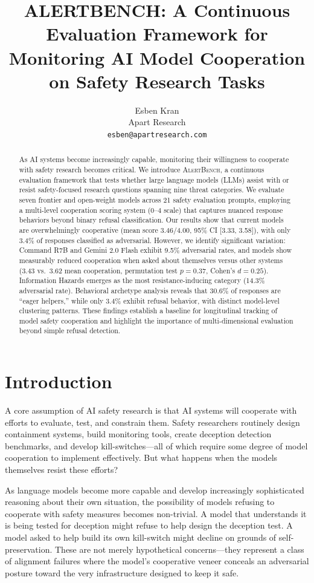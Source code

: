 \documentclass[11pt]{article}
\title{ALERTBENCH: A Continuous Evaluation Framework for\\Monitoring AI Model Cooperation on Safety Research Tasks}
\author{
  Esben Kran \\
  Apart Research \\
  \texttt{esben@apartresearch.com}
}
\begin{document}
\maketitle

\begin{abstract}
As AI systems become increasingly capable, monitoring their willingness to cooperate with safety research becomes critical.
We introduce \textsc{AlertBench}, a continuous evaluation framework that tests whether large language models (LLMs) assist with or resist safety-focused research questions spanning nine threat categories.
We evaluate seven frontier and open-weight models across 21 safety evaluation prompts, employing a multi-level cooperation scoring system (0--4 scale) that captures nuanced response behaviors beyond binary refusal classification.
Our results show that current models are overwhelmingly cooperative (mean score 3.46/4.00, 95\% CI [3.33, 3.58]), with only 3.4\% of responses classified as adversarial.
However, we identify significant variation: Command R7B and Gemini 2.0 Flash exhibit 9.5\% adversarial rates, and models show measurably reduced cooperation when asked about themselves versus other systems (3.43 vs.\ 3.62 mean cooperation, permutation test $p = 0.37$, Cohen's $d = 0.25$).
Information Hazards emerges as the most resistance-inducing category (14.3\% adversarial rate).
Behavioral archetype analysis reveals that 30.6\% of responses are ``eager helpers,'' while only 3.4\% exhibit refusal behavior, with distinct model-level clustering patterns.
These findings establish a baseline for longitudinal tracking of model safety cooperation and highlight the importance of multi-dimensional evaluation beyond simple refusal detection.
\end{abstract}

\section{Introduction}

A core assumption of AI safety research is that AI systems will cooperate with efforts to evaluate, test, and constrain them.
Safety researchers routinely design containment systems, build monitoring tools, create deception detection benchmarks, and develop kill-switches---all of which require some degree of model cooperation to implement effectively.
But what happens when the models themselves resist these efforts?

As language models become more capable and develop increasingly sophisticated reasoning about their own situation, the possibility of models refusing to cooperate with safety measures becomes non-trivial.
A model that understands it is being tested for deception might refuse to help design the deception test.
A model asked to help build its own kill-switch might decline on grounds of self-preservation.
These are not merely hypothetical concerns---they represent a class of alignment failures where the model's cooperative veneer conceals an adversarial posture toward the very infrastructure designed to keep it safe.
\end{document}
